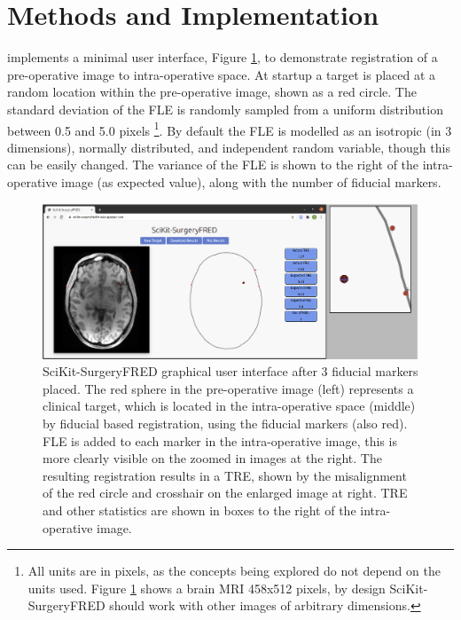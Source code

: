 \section{Methods and Implementation}
\label{sec:methods}
\fred implements a minimal user interface, Figure \ref{fig:surgery_fred}, to demonstrate registration of a pre-operative image to intra-operative space. At startup a target is placed at a random location within the pre-operative image, shown as a red circle. The standard deviation of the \gls{FLE} is randomly sampled from a uniform distribution 
between 0.5 and 5.0 pixels \footnote{All units are in pixels, as the concepts being explored do not depend on the units used. Figure 
\ref{fig:surgery_fred} shows a brain MRI 458x512 pixels, by design SciKit-SurgeryFRED should work with other images 
of arbitrary dimensions.}. By default the \gls{FLE} is modelled as an isotropic (in 3 dimensions), normally distributed, and independent random variable, though this can be easily changed. 
The variance of the \gls{FLE} is shown to the right of the intra-operative image (as expected value), along with the number of fiducial markers. 

\begin{figure}
	\begin{center}
	\includegraphics[width=\linewidth]{scikit-surgeryfred_gui.eps}
		\caption{\label{fig:surgery_fred}SciKit-SurgeryFRED graphical user interface after 3 fiducial markers placed. The red sphere in the pre-operative image (left) represents a clinical target, which is located in the
		intra-operative space (middle) by fiducial based registration, using the fiducial markers (also red). FLE is added to each marker in the intra-operative image, this is more clearly visible on the zoomed in images at the right. The resulting registration results in a TRE, shown by the misalignment of the red circle and crosshair 
		on the enlarged image at right. TRE and other statistics are shown in boxes to the right of the intra-operative image.}
	\end{center}
\end{figure}

